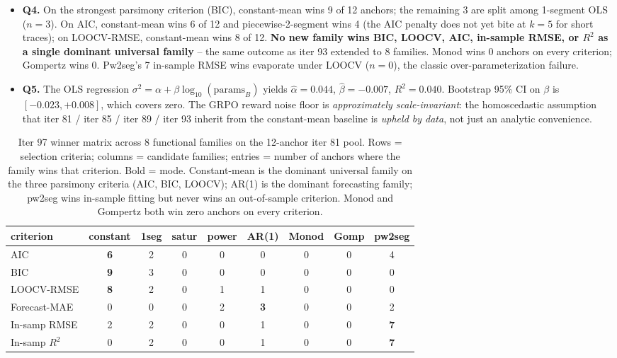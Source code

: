 \begin{itemize}
\item \textbf{Q4.}  On the strongest parsimony criterion (BIC),
constant-mean wins 9 of 12 anchors; the remaining 3 are split among
1-segment OLS ($n=3$).  On AIC, constant-mean wins 6 of 12 and
piecewise-2-segment wins 4 (the AIC penalty does not yet bite at
$k=5$ for short traces); on LOOCV-RMSE, constant-mean wins 8 of 12.
\textbf{No new family wins BIC, LOOCV, AIC, in-sample RMSE, or $R^2$
as a single dominant universal family} -- the same outcome as iter 93
extended to 8 families.  Monod wins 0 anchors on every criterion;
Gompertz wins 0.  Pw2seg's 7 in-sample RMSE wins evaporate under
LOOCV ($n=0$), the classic over-parameterization failure.
\item \textbf{Q5.}  The OLS regression
$\sigma^2 = \alpha + \beta \log_{10}(\mathrm{params}_B)$ yields
$\hat\alpha = 0.044$, $\hat\beta = -0.007$, $R^2 = 0.040$.  Bootstrap
95\% CI on $\beta$ is $[-0.023, +0.008]$, which covers zero.  The
GRPO reward noise floor is \emph{approximately scale-invariant}: the
homoscedastic assumption that iter 81 / iter 85 / iter 89 / iter 93
inherit from the constant-mean baseline is \emph{upheld by data}, not
just an analytic convenience.
\end{itemize}

\begin{table}[htbp]
\centering
\small
\begin{tabular}{lcccccccc}
\hline
criterion & constant & 1seg & satur & power & AR(1) & Monod & Gomp & pw2seg \\
\hline
AIC          & \textbf{6} & 2 & 0 & 0 & 0 & 0 & 0 & 4 \\
BIC          & \textbf{9} & 3 & 0 & 0 & 0 & 0 & 0 & 0 \\
LOOCV-RMSE   & \textbf{8} & 2 & 0 & 1 & 1 & 0 & 0 & 0 \\
Forecast-MAE & 0 & 0 & 0 & 2 & \textbf{3} & 0 & 0 & 2 \\
In-samp RMSE & 2 & 2 & 0 & 0 & 1 & 0 & 0 & \textbf{7} \\
In-samp $R^2$ & 0 & 2 & 0 & 0 & 1 & 0 & 0 & \textbf{7} \\
\hline
\end{tabular}
\caption{Iter 97 winner matrix across 8 functional families on the
12-anchor iter 81 pool.  Rows = selection criteria; columns =
candidate families; entries = number of anchors where the family
wins that criterion.  Bold = mode.  Constant-mean is the dominant
universal family on the three parsimony criteria (AIC, BIC, LOOCV);
AR(1) is the dominant forecasting family; pw2seg wins in-sample
fitting but never wins an out-of-sample criterion.  Monod and Gompertz
both win zero anchors on every criterion.}
\label{tab:scaling-iter97-winners}
\end{table}


